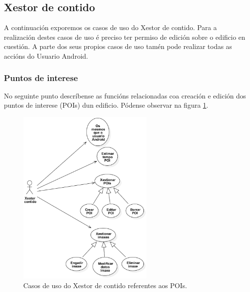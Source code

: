 \subsection{Xestor de contido}

A continuación exporemos os casos de uso do Xestor de contido. Para a realización destes casos de uso é preciso ter permiso de edición sobre o edificio en cuestión. A parte dos seus propios casos de uso tamén pode realizar todas as accións do Usuario Android.

\subsubsection{Puntos de interese}
No seguinte punto descríbense as funcións relacionadas coa creación e edición dos puntos de interese (POIs) dun edificio. Pódense observar na figura \ref{fig:cuXestorContidoPOI}.

\begin{figure}[tbh]
	\begin{center}
		\includegraphics[width=0.6\textwidth]{figures/CasosUso/XestorContidoPoi}
		\caption{Casos de uso do Xestor de contido referentes aos POIs.}
		\label{fig:cuXestorContidoPOI}
	\end{center}
\end{figure}


